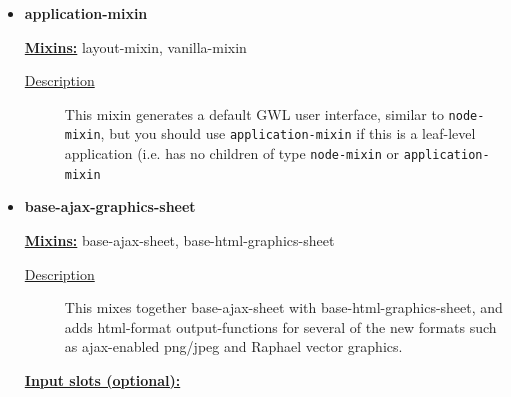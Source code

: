 \documentclass [11pt]{book}
\begin{document}
\label{subsec:objectdefinitions}



\begin{itemize}

\item {}
\label{prim:application-mixin}
\textbf{application-mixin}


\textbf{
\underline{Mixins:}} layout-mixin, vanilla-mixin





\begin{description}

\item [
\underline{Description}]


This mixin generates a default GWL user interface, similar to \texttt{node-mixin}, but you should use
\texttt{application-mixin} if this is a leaf-level application (i.e. has no children of type \texttt{node-mixin}
or \texttt{application-mixin}



\end{description}









\item {}
\label{prim:base-ajax-graphics-sheet}
\textbf{base-ajax-graphics-sheet}


\textbf{
\underline{Mixins:}} base-ajax-sheet, base-html-graphics-sheet





\begin{description}

\item [
\underline{Description}]


This mixes together base-ajax-sheet 
with base-html-graphics-sheet, and adds html-format output-functions 
for several of the new formats such as ajax-enabled png/jpeg and 
Raphael vector graphics.



\end{description}








\textbf{
\underline{Input slots (optional):}}

\begin{description}


\end{description}
\end{itemize}
\end{document}
